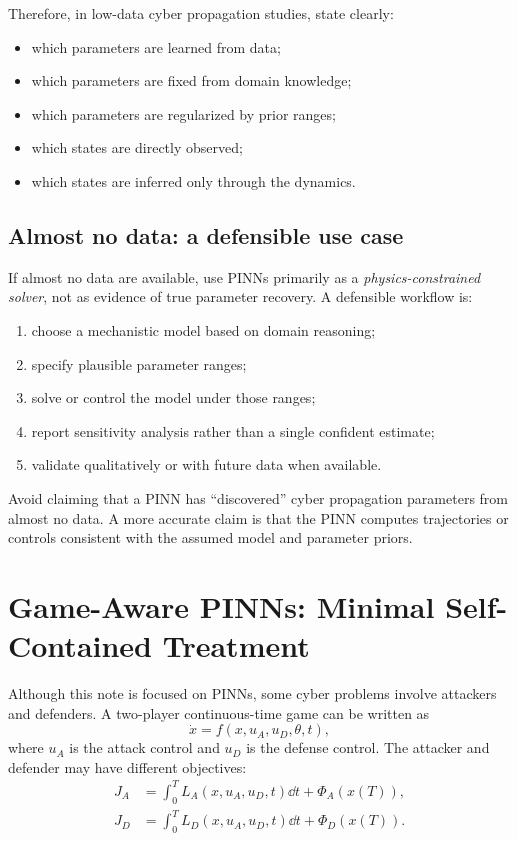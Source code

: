 \documentclass[11pt,a4paper]{article}
\begin{document}
Therefore, in low-data cyber propagation studies, state clearly:
\begin{itemize}[leftmargin=2em]
    \item which parameters are learned from data;
    \item which parameters are fixed from domain knowledge;
    \item which parameters are regularized by prior ranges;
    \item which states are directly observed;
    \item which states are inferred only through the dynamics.
\end{itemize}

\subsection{Almost no data: a defensible use case}
If almost no data are available, use PINNs primarily as a \emph{physics-constrained solver}, not as evidence of true parameter recovery. A defensible workflow is:
\begin{enumerate}[leftmargin=2em]
    \item choose a mechanistic model based on domain reasoning;
    \item specify plausible parameter ranges;
    \item solve or control the model under those ranges;
    \item report sensitivity analysis rather than a single confident estimate;
    \item validate qualitatively or with future data when available.
\end{enumerate}

\begin{warningbox}
Avoid claiming that a PINN has ``discovered'' cyber propagation parameters from almost no data. A more accurate claim is that the PINN computes trajectories or controls consistent with the assumed model and parameter priors.
\end{warningbox}

\section{Game-Aware PINNs: Minimal Self-Contained Treatment}

Although this note is focused on PINNs, some cyber problems involve attackers and defenders. A two-player continuous-time game can be written as
\begin{equation}
    \dot{x}=f(x,u_A,u_D,\theta,t),
\end{equation}
where $u_A$ is the attack control and $u_D$ is the defense control. The attacker and defender may have different objectives:
\begin{align}
    J_A &= \int_0^T L_A(x,u_A,u_D,t)\dd t+\Phi_A(x(T)),\\
    J_D &= \int_0^T L_D(x,u_A,u_D,t)\dd t+\Phi_D(x(T)).
\end{align}
\end{document}

